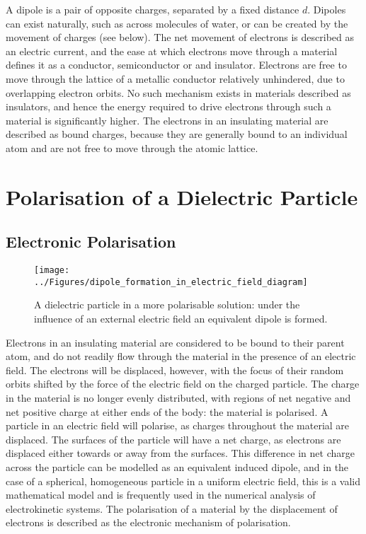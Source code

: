 A dipole is a pair of opposite charges, separated by a fixed distance $d$. Dipoles can exist naturally, such as across molecules of water, or can be created by the movement of charges (see below). The net movement of electrons is described as an electric current, and the ease at which electrons move through a material defines it as a conductor, semiconductor or and insulator. Electrons are free to move through the lattice of a metallic conductor relatively unhindered, due to overlapping electron orbits. No such mechanism exists in materials described as insulators, and hence the energy required to drive electrons through such a material is significantly higher. The electrons in an insulating material are described as bound charges, because they are generally bound to an individual atom and are not free to move through the atomic lattice.

\section{Polarisation of a Dielectric Particle}
\subsection{Electronic Polarisation}

\begin{figure}
 \centering
 \texttt{[image: ../Figures/dipole\_formation\_in\_electric\_field\_diagram]}
 \caption[Dipole formation on a particle in solution under an external electric field.]{A dielectric particle in a more polarisable solution: under the influence of an external electric field an equivalent dipole is formed.}
 \label{fig:dipole_formation_in_electric_field_diagram}
\end{figure}

Electrons in an insulating material are considered to be bound to their parent atom, and do not readily flow through the material in the presence of an electric field. The electrons will be displaced, however, with the focus of their random orbits shifted by the force of the electric field on the charged particle. The charge in the material is no longer evenly distributed, with regions of net negative and net positive charge at either ends of the body: the material is polarised. A particle in an electric field will polarise, as charges throughout the material are displaced. The surfaces of the particle will have a net charge, as electrons are displaced either towards or away from the surfaces. This difference in net charge across the particle can be modelled as an equivalent induced dipole, and in the case of a spherical, homogeneous particle in a uniform electric field, this is a valid mathematical model and is frequently used in the numerical analysis of electrokinetic systems. The polarisation of a material by the displacement of electrons is described as the electronic mechanism of polarisation.

